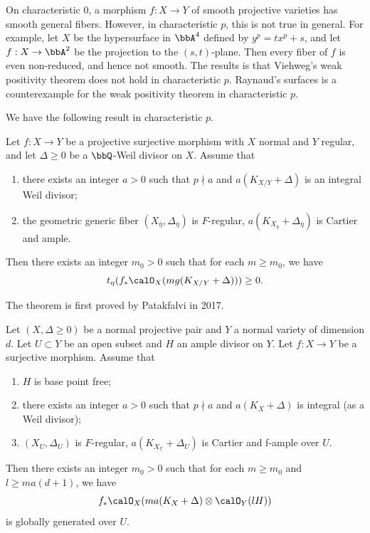 On characteristic $0$, a morphism $f: X \to Y$ of smooth projective varieties has smooth general fibers.
However, in characteristic $p$, this is not true in general.
For example, let $X$ be the hypersurface in $\bbA^4$ defined by $y^p = tx^p + s$, and let $f: X \to \bbA^2$ be the projection to the $(s,t)$-plane.
Then every fiber of $f$ is even non-reduced, and hence not smooth.
The results is that Viehweg's weak positivity theorem does not hold in characteristic $p$.
Raynaud's surfaces is a counterexample for the weak positivity theorem in characteristic $p$.

We have the following result in characteristic $p$.

\begin{theorem}\label{thm:positivity3-Patakfalvi12}
	Let $f: X \to Y$ be a projective surjective morphism with $X$ normal and $Y$ regular, and let $\Delta \geq 0$ be a $\bbQ$-Weil divisor on $X$.
	Assume that
	\begin{enumerate}
		\item there exists an integer $a > 0$ such that $p \nmid a$ and $a(K_{X/Y} + \Delta)$ is an integral Weil divisor;
		\item the geometric generic fiber $(X_{\overline{\eta}}, \Delta_{\overline{\eta}})$ is $F$-regular, $a(K_{X_{\overline{\eta}}} + \Delta_{\overline{\eta}})$ is Cartier and ample.
	\end{enumerate}
	Then there exists an integer $m_0 > 0$ such that for each $m \geq m_0$, we have
	\[ t_\eta (f_* \calO_X(mg(K_{X/Y} + \Delta))) \geq 0. \]
\end{theorem}

The theorem is first proved by Patakfalvi in 2017.

\begin{theorem}\label{thm:positivity3-Ejiri24}
	Let $(X, \Delta \geq 0)$ be a normal projective pair and $Y$ a normal variety of dimension $d$.
	Let $U \subset Y$ be an open subset and $H$ an ample divisor on $Y$.
	Let $f:X \to Y$ be a surjective morphism.
	Assume that
	\begin{enumerate}
		\item $H$ is base point free;
		\item there exists an integer $a > 0$ such that $p \nmid a$ and $a(K_X + \Delta)$ is integral (as a Weil divisor);
		\item $(X_U, \Delta_U)$ is $F$-regular, $a(K_{X_U} + \Delta_U)$ is Cartier and f-ample over $U$.
	\end{enumerate}
	Then there exists an integer $m_0 > 0$ such that for each $m \geq m_0$ and $l \geq ma(d + 1)$, we have
	\[ f_* \calO_X(ma(K_{X} + \Delta) \otimes \calO_Y(lH)) \]
	is globally generated over $U$.
\end{theorem}

